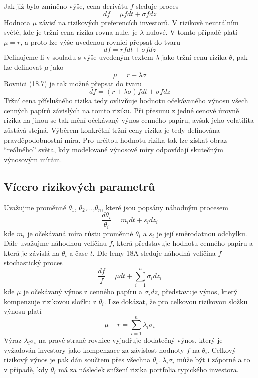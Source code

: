 \documentclass[a4paper]{book}
\begin{document}
Jak již bylo zmíněno výše, cena derivátu $f$ sleduje proces
\begin{equation}
df = \mu f dt + \sigma f dz
\end{equation}
Hodnota $\mu$ závisí na rizikových preferencích investorů. V rizikově neutrálním světě, kde je tržní cena rizika rovna nule, je $\lambda$ nulové. V tomto případě platí $\mu = r$, a proto lze výše uvedenou rovnici přepsat do tvaru
\begin{equation*}
df = r f dt + \sigma f dz
\end{equation*}
Definujeme-li v souladu s výše uvedeným textem $\lambda$ jako tržní cenu rizika $\theta$, pak lze definovat $\mu$ jako
\begin{equation*}
\mu = r + \lambda \sigma
\end{equation*}
Rovnici (18.7) je tak možné přepsat do tvaru
\begin{equation}
df = (r + \lambda \sigma)f dt + \sigma f dz
\end{equation}
Tržní cena příslušného rizika tedy ovlivňuje hodnotu očekávaného výnosu všech cenných papírů závislých na tomto riziku. Při přesunu z jedné cenové úrovně rizika na jinou se tak mění očekávaný výnos cenného papíru, avšak jeho volatilita zůstává stejná. Výběrem konkrétní tržní ceny rizika je tedy definována pravděpodobnostní míra. Pro určitou hodnotu rizika tak lze získat obraz ``reálného'' světa, kdy modelované výnosové míry odpovídají skutečným výnosovým mírám.

\subsection{Vícero rizikových parametrů}

Uvažujme proměnné $\theta_1$, $\theta_2$,...,$\theta_n$, které jsou popsány náhodným procesem
\begin{equation*}
\frac{d \theta_i}{\theta_i} = m_i dt + s_i dz_i
\end{equation*}
kde $m_i$ je očekávaná míra růstu proměnné $\theta_i$ a $s_i$ je její směrodatnou odchylku. Dále uvažujme náhodnou veličinu $f$, která představuje hodnotu cenného papíru a která je závislá na $\theta_i$ a čase $t$. Dle lemy 18A sleduje náhodná veličina $f$ stochastický proces
\begin{equation*}
\frac{d f}{f} = \mu dt + \sum^n_{i=1}\sigma_i dz_i
\end{equation*}
kde $\mu$ je očekávaný výnos z cenného papíru a $\sigma_i dz_i$ představuje výnos, který kompenzuje rizikovou složku z $\theta_i$. Lze dokázat, že pro celkovou rizikovou složku výnosu platí
\begin{equation*}
\mu - r = \sum^n_{i=1}\lambda_i \sigma_i
\end{equation*}
Výraz $\lambda_i \sigma_i$ na pravé straně rovnice vyjadřuje dodatečný výnos, který je vyžadován investory jako kompenzace za závislost hodnoty $f$ na $\theta_i$. Celkový rizikový výnos je pak dán součtem přes všechna $\theta_i$. $\lambda_i \sigma_i$ může být i záporné a to v případě, kdy $\theta_i$ má za následek snížení rizika portfolia typického investora.
\end{document}
